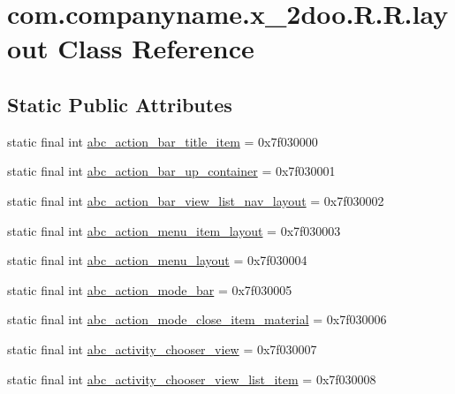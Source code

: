 \hypertarget{classcom_1_1companyname_1_1x__2doo_1_1_r_1_1layout}{
\section{com.companyname.x\_\-2doo.R.R.layout Class Reference}
\label{classcom_1_1companyname_1_1x__2doo_1_1_r_1_1layout}
}
\subsection*{Static Public Attributes}
\begin{CompactItemize}
\item 
static final int \hyperlink{classcom_1_1companyname_1_1x__2doo_1_1_r_1_1layout_7f6dbd97ddaf1e2ec9ac5585bf25c39d}{abc\_\-action\_\-bar\_\-title\_\-item} = 0x7f030000
\item 
static final int \hyperlink{classcom_1_1companyname_1_1x__2doo_1_1_r_1_1layout_9846de992b24482b89c5c9c606414698}{abc\_\-action\_\-bar\_\-up\_\-container} = 0x7f030001
\item 
static final int \hyperlink{classcom_1_1companyname_1_1x__2doo_1_1_r_1_1layout_57c11e99fd9e843442f80a29a0cbaa60}{abc\_\-action\_\-bar\_\-view\_\-list\_\-nav\_\-layout} = 0x7f030002
\item 
static final int \hyperlink{classcom_1_1companyname_1_1x__2doo_1_1_r_1_1layout_6cc6ad976c448c7c67586d6bbcbb1657}{abc\_\-action\_\-menu\_\-item\_\-layout} = 0x7f030003
\item 
static final int \hyperlink{classcom_1_1companyname_1_1x__2doo_1_1_r_1_1layout_77b8de669b6f52b83f7c33e5d49100ae}{abc\_\-action\_\-menu\_\-layout} = 0x7f030004
\item 
static final int \hyperlink{classcom_1_1companyname_1_1x__2doo_1_1_r_1_1layout_dc9687e91450eca61c75a8e97b255dc3}{abc\_\-action\_\-mode\_\-bar} = 0x7f030005
\item 
static final int \hyperlink{classcom_1_1companyname_1_1x__2doo_1_1_r_1_1layout_47833866125b1e0fe31924302e0567da}{abc\_\-action\_\-mode\_\-close\_\-item\_\-material} = 0x7f030006
\item 
static final int \hyperlink{classcom_1_1companyname_1_1x__2doo_1_1_r_1_1layout_f0ee5d17bb8cffdd864f01c8e87ce2a6}{abc\_\-activity\_\-chooser\_\-view} = 0x7f030007
\item 
static final int \hyperlink{classcom_1_1companyname_1_1x__2doo_1_1_r_1_1layout_90e7ee614c5574e8e528a4f005d5f4b6}{abc\_\-activity\_\-chooser\_\-view\_\-list\_\-item} = 0x7f030008

\end{CompactItemize}
